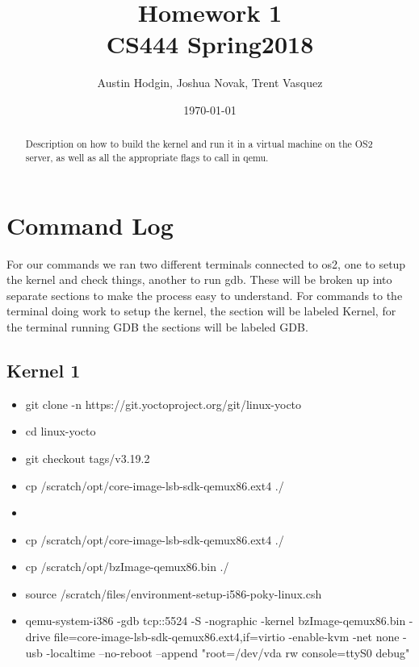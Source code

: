 \documentclass[onecolumn, draftclsnofoot,10pt, compsoc]{IEEEtran}
\title{Homework 1\\\large CS444 Spring2018}
\author{Austin Hodgin, Joshua Novak, Trent Vasquez}
\date{\today}
\begin{document}
\begin{titlingpage}
			\maketitle
      \begin{abstract}
			\noindent
			Description on how to build the kernel and run it in a virtual machine on the OS2 server, as well as all the appropriate flags to call in qemu.
      \end{abstract}
\end{titlingpage}

\newpage
{}

\clearpage
\singlespace



\section{Command Log}
For our commands we ran two different terminals connected to os2, one to setup the kernel and check things, another to run gdb. These will be broken up into separate sections to make the process easy to understand. For commands to the terminal doing work to setup the kernel, the section will be labeled Kernel, for the terminal running GDB the sections will be labeled GDB.
    \subsection{Kernel 1}
        \begin{itemize}
            \item git clone -n https://git.yoctoproject.org/git/linux-yocto
            \item cd linux-yocto
            \item git checkout tags/v3.19.2
            \item cp /scratch/opt/core-image-lsb-sdk-qemux86.ext4 ./
            \item \item cp /scratch/opt/core-image-lsb-sdk-qemux86.ext4 ./
            \item cp /scratch/opt/bzImage-qemux86.bin ./
            \item source /scratch/files/environment-setup-i586-poky-linux.csh\
            \item qemu-system-i386 -gdb tcp::5524 -S -nographic -kernel bzImage-qemux86.bin -drive file=core-image-lsb-sdk-qemux86.ext4,if=virtio -enable-kvm -net none -usb -localtime --no-reboot --append "root=/dev/vda rw console=ttyS0 debug"
        \end{itemize}
\end{document}
